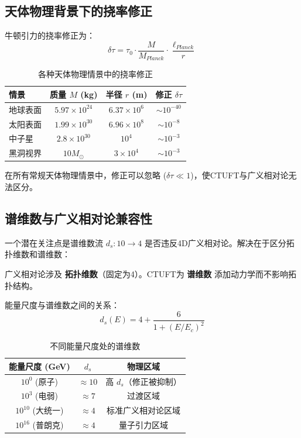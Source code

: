 \subsection{天体物理背景下的挠率修正}

牛顿引力的挠率修正为：
\begin{equation}
    \delta\tau = \tau_0 \cdot \frac{M}{M_{Planck}} \cdot \frac{\ell_{Planck}}{r}
    \label{eq:torsion_correction}
\end{equation}

\begin{table}[htbp]
\centering
\caption{各种天体物理情景中的挠率修正}
\begin{tabular}{@{}lccc@{}}
\hline
情景 & 质量 $M$ (kg) & 半径 $r$ (m) & 修正 $\delta\tau$ \\
\hline
地球表面 & $5.97 \times 10^{24}$ & $6.37 \times 10^6$ & $\sim 10^{-40}$ \\
太阳表面 & $1.99 \times 10^{30}$ & $6.96 \times 10^8$ & $\sim 10^{-8}$ \\
中子星 & $2.8 \times 10^{30}$ & $10^4$ & $\sim 10^{-3}$ \\
黑洞视界 & $10M_\odot$ & $3 \times 10^4$ & $\sim 10^{-3}$ \\
\hline
\end{tabular}
\label{tab:torsion_corrections}
\end{table}

在所有常规天体物理情景中，修正可以忽略 ($\delta\tau \ll 1$)，使CTUFT与广义相对论无法区分。

\subsection{谱维数与广义相对论兼容性}

一个潜在关注点是谱维数流 $d_s: 10 \to 4$ 是否违反4D广义相对论。解决在于区分拓扑维数和谱维数：

\begin{proposition}[广义相对论兼容性]
广义相对论涉及 \textbf{拓扑维数}（固定为4）。CTUFT为 \textbf{谱维数} 添加动力学而不影响拓扑结构。
\end{proposition}

能量尺度与谱维数之间的关系：
\begin{equation}
    d_s(E) = 4 + \frac{6}{1 + (E/E_c)^2}
    \label{eq:spectral_vs_energy}
\end{equation}

\begin{table}[htbp]
\centering
\caption{不同能量尺度处的谱维数}
\begin{tabular}{@{}ccc@{}}
\hline
能量尺度 (GeV) & $d_s$ & 物理区域 \\
\hline
$10^0$ (原子) & $\approx 10$ & 高 $d_s$（修正被抑制） \\
$10^3$ (电弱) & $\approx 7$ & 过渡区域 \\
$10^{10}$ (大统一) & $\approx 4$ & 标准广义相对论区域 \\
$10^{16}$ (普朗克) & $\approx 4$ & 量子引力区域 \\
\hline
\end{tabular}
\label{tab:spectral_energy}
\end{table}


